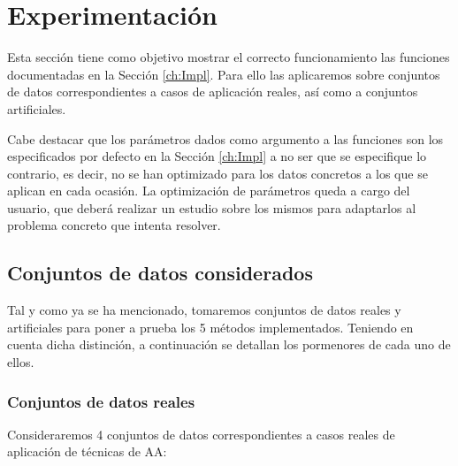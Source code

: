 \chapter{Experimentación}\label{ch:Experimentación}

Esta sección tiene como objetivo mostrar el correcto funcionamiento las funciones documentadas en la Sección \ref{ch:Impl}. Para ello las aplicaremos sobre conjuntos de datos correspondientes a casos de aplicación reales, así como a conjuntos artificiales.

Cabe destacar que los parámetros dados como argumento a las funciones son los especificados por defecto en la Sección \ref{ch:Impl} a no ser que se especifique lo contrario, es decir, no se han optimizado para los datos concretos a los que se aplican en cada ocasión. La optimización de parámetros queda a cargo del usuario, que deberá realizar un estudio sobre los mismos para adaptarlos al problema concreto que intenta resolver.

\section{Conjuntos de datos considerados} \label{datasets}

Tal y como ya se ha mencionado, tomaremos conjuntos de datos reales y artificiales para poner a prueba los 5 métodos implementados. Teniendo en cuenta dicha distinción, a continuación se detallan los pormenores de cada uno de ellos.

\subsection{Conjuntos de datos reales}

Consideraremos 4 conjuntos de datos correspondientes a casos reales de aplicación de técnicas de \acf{AA}:

